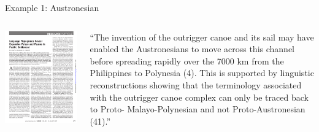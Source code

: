 \documentclass[9pt]{beamer}
\begin{document}
\begin{frame}{Example 1: Austronesian}
  \begin{columns}
    \begin{column}{0.5\textwidth}
      \includegraphics[width=\textwidth,page=2,trim={2cm 4cm 1cm 5cm},clip]{austronesian.pdf}
    \end{column}
    \begin{column}{0.5\textwidth}
      \footnotesize “The invention of the outrigger canoe and its
        sail may have enabled the Austronesians to move across this
        channel before spreading rapidly over the 7000 km from the
        Philippines to Polynesia (4). This is supported by linguistic
        reconstructions showing that the terminology associated with
        the outrigger canoe complex can only be traced back to Proto-
        Malayo-Polynesian and not Proto-Austronesian (41).”

\end{column}
\end{columns}
\end{frame}
\end{document}
